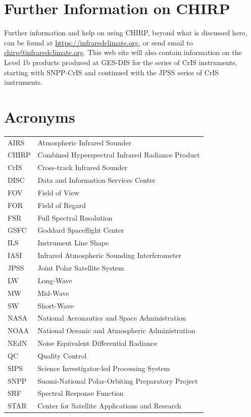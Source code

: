\documentclass[11pt]{article}
\begin{document}
\section{Further Information on CHIRP}
Further information and help on using CHIRP, beyond what is discussed
here, can be found at
\href{https://infraredclimate.org}{https://infraredclimate.org}, or send
email to
\href{mailto:chirp@infraredclimate.org}{chirp@infraredclimate.org}.  This
web site will also contain information on the Level 1b products produced at
GES-DIS for the series of CrIS instruments, starting with SNPP-CrIS and
continued with the JPSS series of CrIS instruments.

% 



\appendix
\section{Acronyms}

\begin{center}
\begin{tabular}{ m{2cm} m{10cm} }
AIRS    & Atmospheric Infrared Sounder \\
CHIRP   & Combined Hyperspectral Infrared Radiance Product \\
CrIS    & Cross-track Infrared Sounder \\
DISC    & Data and Information Services Center \\
FOV     & Field of View \\
FOR     & Field of Regard \\
FSR     & Full Spectral Resolution \\
GSFC    & Goddard Spaceflight Center \\
ILS     & Instrument Line Shape \\
IASI    & Infrared Atmospheric Sounding Interferometer \\
JPSS    & Joint Polar Satellite System \\
LW      & Long-Wave \\
MW      & Mid-Wave \\
SW      & Short-Wave \\
NASA    & National Aeronautics and Space Administration \\
NOAA    & National Oceanic and Atmospheric Administration \\
NEdN    & Noise Equivalent Differential Radiance \\
QC      & Quality Control \\
SIPS    & Science Investigator-led Processing System \\
SNPP    & Suomi-National Polar-Orbiting Preparatory Project \\
SRF     & Spectral Response Function \\
STAR    & Center for Satellite Applications and Research \\
\end{tabular}
\end{center}
\end{document}
